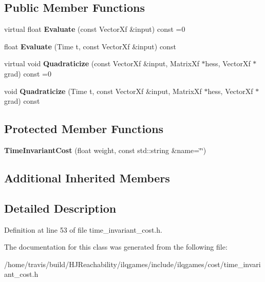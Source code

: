 \subsection*{Public Member Functions}
\begin{DoxyCompactItemize}
\item 
virtual float {\bfseries Evaluate} (const Vector\+Xf \&input) const =0\hypertarget{classilqgames_1_1_time_invariant_cost_a61c214ac9833c3f42b51167bdec1cbc7}{}\label{classilqgames_1_1_time_invariant_cost_a61c214ac9833c3f42b51167bdec1cbc7}

\item 
float {\bfseries Evaluate} (Time t, const Vector\+Xf \&input) const \hypertarget{classilqgames_1_1_time_invariant_cost_a1e59c75a8765e4d89243c20838cc2bed}{}\label{classilqgames_1_1_time_invariant_cost_a1e59c75a8765e4d89243c20838cc2bed}

\item 
virtual void {\bfseries Quadraticize} (const Vector\+Xf \&input, Matrix\+Xf $\ast$hess, Vector\+Xf $\ast$grad) const =0\hypertarget{classilqgames_1_1_time_invariant_cost_abe3173385a2f31fa556c1553075eb18f}{}\label{classilqgames_1_1_time_invariant_cost_abe3173385a2f31fa556c1553075eb18f}

\item 
void {\bfseries Quadraticize} (Time t, const Vector\+Xf \&input, Matrix\+Xf $\ast$hess, Vector\+Xf $\ast$grad) const \hypertarget{classilqgames_1_1_time_invariant_cost_a185aa5080bcdaa68804810d1a046ebcd}{}\label{classilqgames_1_1_time_invariant_cost_a185aa5080bcdaa68804810d1a046ebcd}

\end{DoxyCompactItemize}
\subsection*{Protected Member Functions}
\begin{DoxyCompactItemize}
\item 
{\bfseries Time\+Invariant\+Cost} (float weight, const std\+::string \&name=\char`\"{}\char`\"{})\hypertarget{classilqgames_1_1_time_invariant_cost_ae84f729918d8c10d9dfa962d57baca6d}{}\label{classilqgames_1_1_time_invariant_cost_ae84f729918d8c10d9dfa962d57baca6d}

\end{DoxyCompactItemize}
\subsection*{Additional Inherited Members}


\subsection{Detailed Description}


Definition at line 53 of file time\+\_\+invariant\+\_\+cost.\+h.



The documentation for this class was generated from the following file\+:\begin{DoxyCompactItemize}
\item 
/home/travis/build/\+H\+J\+Reachability/ilqgames/include/ilqgames/cost/time\+\_\+invariant\+\_\+cost.\+h\end{DoxyCompactItemize}
